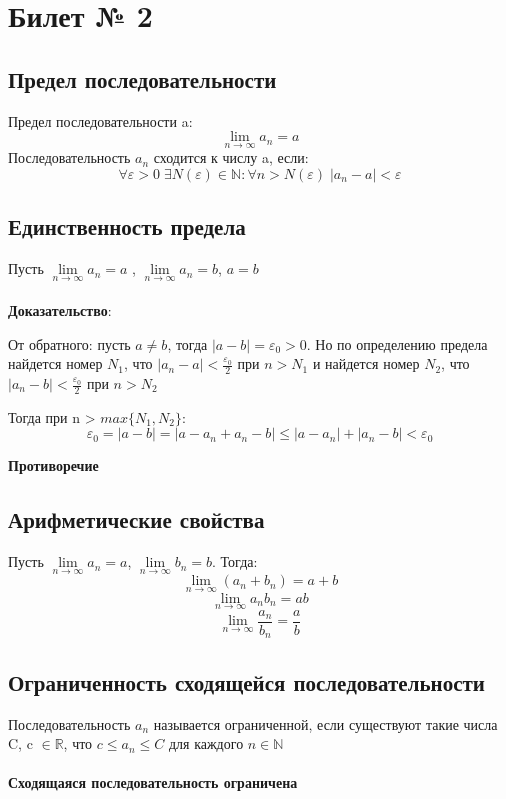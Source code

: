 \documentclass[a4paper,12pt]{article}
\begin{document}
\newpage
\section*{Билет № 2}
\subsection*{Предел последовательности}
Предел последовательности a:
\[
\lim_{n \rightarrow \infty} a_n = a
\]
Последовательность $a_n$ сходится к числу a, если:
\[
\forall \varepsilon > 0 \; \exists N(\varepsilon) \in \mathbb{N}: \forall n > N(\varepsilon) \; |a_n - a| < \varepsilon
\]
\subsection*{Единственность предела}
Пусть $
\lim\limits_{n \rightarrow \infty} a_n = a $
,\; $ \lim\limits_{n \rightarrow \infty} a_n = b$,\; $ a = b$
\\\\

\textbf{Доказательство}:

От обратного: пусть $a \neq b$, тогда $|a - b| = \varepsilon_0 > 0$. 
Но по определению предела найдется номер $N_1$, что $|a_n - a| < \frac{\varepsilon_0}{2} $ при $n > N_1$ и найдется номер 
$N_2$, что $|a_n - b| < \frac{\varepsilon_0}{2} $ при $ n > N_2$

Тогда при n > $ {max} \{ N_1, N_2\} $:
\[
\varepsilon_0 = | a - b| = |a - a_n + a_n - b| \leq |a - a_n| + |a_n - b| < \varepsilon_0
\]
\begin{center}
\textbf{Противоречие}
\end{center}
\subsection*{Арифметические свойства}
Пусть
$
\lim\limits_{n \rightarrow \infty} a_n = a
$, \;
$
\lim\limits_{n \rightarrow \infty} b_n = b
$.
Тогда:
\[
\lim_{n \rightarrow \infty} (a_n + b_n) = a + b
\]
\[
\lim_{n \rightarrow \infty} a_nb_n = ab 
\]
\[
\lim_{n \rightarrow \infty} \frac{a_n}{b_n} = \frac{a}{b}
\]

\subsection*{Ограниченность сходящейся последовательности}
Последовательность $a_n$ называется ограниченной, если существуют такие числа C, c $\in \mathbb{R}$, что $ c \leq a_n \leq C$ для каждого $n \in \mathbb{N}$
\\\\
\textbf{Сходящаяся последовательность ограничена}
\end{document}

